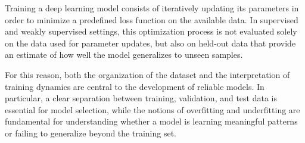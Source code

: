 Training a deep learning model consists of iteratively updating its parameters in order to minimize a predefined loss function on the available data.\cite{goodfellow_deep_2016} In supervised and weakly supervised settings, this optimization process is not evaluated solely on the data used for parameter updates, but also on held-out data that provide an estimate of how well the model generalizes to unseen samples.\cite{goodfellow_deep_2016}

For this reason, both the organization of the dataset and the interpretation of training dynamics are central to the development of reliable models. In particular, a clear separation between training, validation, and test data is essential for model selection, while the notions of overfitting and underfitting are fundamental for understanding whether a model is learning meaningful patterns or failing to generalize beyond the training set.\cite{goodfellow_deep_2016}
